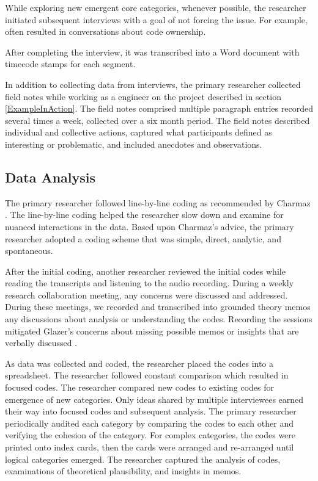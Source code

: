 While exploring new emergent core categories, whenever possible, the researcher initiated subsequent interviews with a goal of not forcing the issue. For example,  often resulted in conversations about code ownership. 

After completing the interview, it was transcribed into a Word document with timecode stamps for each segment.

In addition to collecting data from interviews, the primary researcher collected field notes while working as a engineer on the project described in section \ref{ExampleInAction}. The field notes comprised multiple paragraph entries recorded several times a week, collected over a six month period. The field notes described individual and collective actions, captured what participants defined as interesting or problematic, and included anecdotes and observations. 
\subsection{Data Analysis}
The primary researcher followed line-by-line coding as recommended by Charmaz \cite{Charmaz}. The line-by-line coding helped the researcher slow down and examine for nuanced interactions in the data. Based upon Charmaz's advice, the primary researcher adopted a coding scheme that was simple, direct, analytic, and spontaneous.  

After the initial coding, another researcher reviewed the initial codes while reading the transcripts and listening to the audio recording. During a weekly research collaboration meeting, any concerns were discussed and addressed. During these meetings, we recorded and transcribed into grounded theory memos any discussions about analysis or understanding the codes. Recording the sessions mitigated Glazer's concerns about missing possible memos or insights that are verbally discussed \cite{GlaserTheoreticalSensitivity}.

As data was collected and coded, the researcher placed the codes into a spreadsheet. The researcher followed constant comparison which resulted in focused codes.  The researcher compared new codes to existing codes for emergence of new categories. Only ideas shared by multiple interviewees earned their way into focused codes and subsequent analysis. The primary researcher periodically audited each category by comparing the codes to each other and verifying the cohesion of the category. For complex categories, the codes were printed onto index cards, then the cards were arranged and re-arranged until logical categories emerged.  The researcher captured the analysis of codes, examinations of theoretical plausibility, and insights in memos. 

